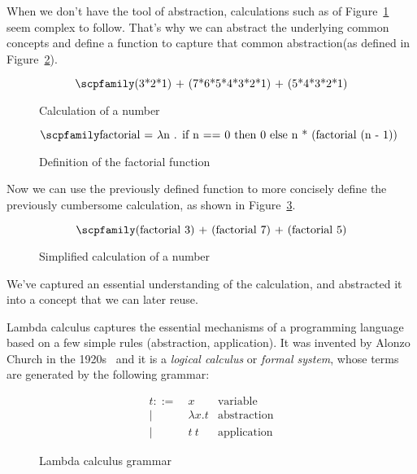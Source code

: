 \documentclass[
       embeddedlogo,
       english,
       lmodern,
       coorientadorbanca,
       noabntexcite
]{ufsc-thesis-rn46-2019}
\theoremstyle{definition}
\newcommand{\code}[1]{\text{\scpfamily\setlength\spaceskip{0.35em}#1}}
\begin{document}
When we don't have the tool of abstraction, calculations such as of Figure~\ref{fig:sample-calculation} seem complex to follow.
That's why we can abstract the underlying common concepts and define a function to capture that common abstraction(as defined in Figure~\ref{fig:factorial-def}).

\begin{figure}[H]
       \begin{equation*}
              \code{(3*2*1) + (7*6*5*4*3*2*1) + (5*4*3*2*1)}
       \end{equation*}
       \caption{Calculation of a number}
       \label{fig:sample-calculation}
\end{figure}


\begin{figure}[H]
       \begin{equation*}
              \code{factorial = $\lambda$n . if n == 0 then 0 else n * (factorial (n - 1))}
       \end{equation*}
       \caption{Definition of the factorial function}\label{fig:factorial-def}
\end{figure}

Now we can use the previously defined function to more concisely define the previously cumbersome calculation, as shown in Figure~\ref{fig:factorial-calc}.

\begin{figure}[H]
       \begin{equation*}
              \code{(factorial 3) + (factorial 7) + (factorial 5)}
       \end{equation*}
       \caption{Simplified calculation of a number}
       \label{fig:factorial-calc}
\end{figure}


We've captured an essential understanding of the calculation, and abstracted it into a concept that we can later reuse.

Lambda calculus captures the essential mechanisms of a programming language based on a few simple rules (abstraction, application). It was invented by Alonzo Church in the 1920s~\cite{tapl} and it is a \emph{logical calculus} or \emph{formal system}, whose terms are generated by the following grammar:

\begin{figure}[H]
       \begin{equation*}
              \begin{aligned}
                     t ::= & \ x            & \text{variable}    \\
                     |     & \  \lambda x.t & \text{abstraction} \\
                     |     & \  t\ t        & \text{application}
              \end{aligned}
       \end{equation*}
       \caption{Lambda calculus grammar}\label{fig:lambda-calc-grammar}
\end{figure}
\end{document}
